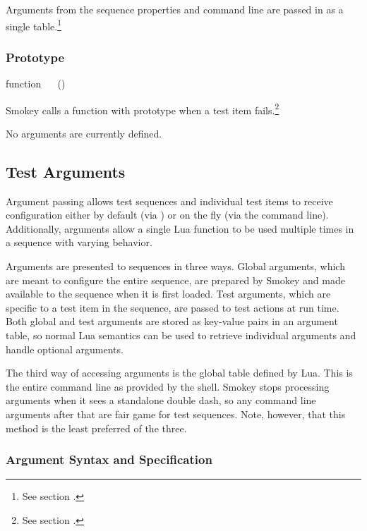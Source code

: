 Arguments from the sequence properties and command line are passed in as a
single table.\footnote{See section .}

\subsubsection{ Prototype}

\begin{SmokeyApi}
function ~~ ()
\end{SmokeyApi}

Smokey calls a function with prototype  when a test item
fails.\footnote{See section .}

No arguments are currently defined.

\subsection{Test Arguments}
\label{sec:TestArguments}

Argument passing allows test sequences and individual test items to receive
configuration either by default (via ) or on the fly (via
the command line).  Additionally, arguments allow a single Lua function to be
used multiple times in a sequence with varying behavior.

Arguments are presented to sequences in three ways.  Global arguments, which
are meant to configure the entire sequence, are prepared by Smokey and made
available to the sequence when it is first loaded.  Test arguments, which are
specific to a test item in the sequence, are passed to test actions at run
time.  Both global and test arguments are stored as key-value pairs in an
argument table, so normal Lua semantics can be used to retrieve individual
arguments and handle optional arguments.

The third way of accessing arguments is the global table  defined by
Lua.  This is the entire command line as provided by the shell.  Smokey stops
processing arguments when it sees a standalone double dash, so any command line
arguments after that are fair game for test sequences.  Note, however, that
this method is the least preferred of the three.

\subsubsection{Argument Syntax and Specification}

